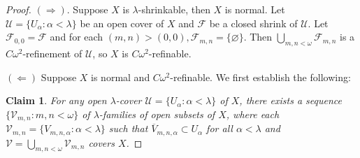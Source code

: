 \documentclass[jisng5i.tex]{subfiles}
\begin{document}
\begin{proof}
\((\Rightarrow)\). Suppose \(X\) is $\lambda$-shrinkable, then \(X\) is normal. 
Let \(\mathscr{U} = \{ U_\alpha: \alpha < \lambda \}\) be an open cover of \(X\) and 
\(\mathscr{F}\) be a closed shrink of \(\mathscr{U}\). Let $\mathscr{F}_{0,0} = \mathscr{F}$ and 
 for each $(m, n) > (0,0), \mathscr{F}_{m,n}=\{\varnothing\}$.
 Then \(\bigcup_{m,n<\omega} \mathscr{F}_{m,n}\) is a \(C\omega^2\)-refinement of 
 \(\mathscr{U}\), so \(X\) is \(C\omega^2\)-refinable.
	
\((\Leftarrow)\) Suppose \(X\) is normal and \(C\omega^2\)-refinable. 
We first establish the following:
	
\textbf{Claim 1}. \textit{For any open \(\lambda\)-cover \(\mathscr{U} = \{U_\alpha: \alpha < \lambda\}\) 
of \(X\), there exists a sequence $\{\mathscr{V}_{m,n}: m,n<\omega\}$ of 
\(\lambda\)-families of open 
subsets of $X$, 
where each \(\mathscr{V}_{m,n} = \{ V_{m,n,\alpha}: \alpha < \lambda\}\) 
such that \(\overline{V}_{m,n,\alpha} \subset U_\alpha\) for all \(\alpha < \lambda\) and 
\(\mathscr{V} = \bigcup_{m,n<\omega} \mathscr{V}_{m,n}\) covers \(X\).}


\end{proof}
\end{document}
